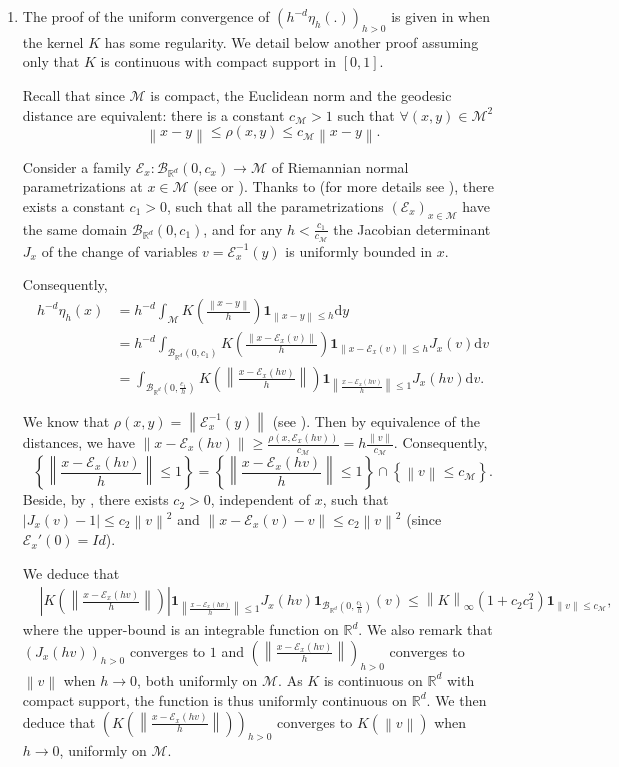 \documentclass[10pt,a4paper]{article}
\newcommand{\R}{{\mathbb R}}
\newcommand{\ind}{{\mathbf 1}}
\newcommand{\B}{\mathcal{B}} %
\newcommand\cB{\mathcal{B}}
\newcommand\cE{\mathcal{E}}
\newcommand\cM{\mathcal{M}}
\newcommand\dR{\mathbb{R}}
\newcommand\dd{\mathrm{d}}
\newcommand{\ABS}[1]{{{\left| #1 \right|}}} %
\newcommand{\BRA}[1]{{{\left\{#1\right\}}}} %
\newcommand{\NRM}[1]{{{\left\| #1\right\|}}} %
\newcommand{\PAR}[1]{{{\left(#1\right)}}} %
\begin{document}
\begin{enumerate}[label=(\roman*)]
\item 
The proof of the uniform convergence of $(h^{-d}\eta_h(.))_{h>0}$ is given in \cite[Lemma 10]{Divol2022} when the kernel $K$ has some regularity. 
We detail below another proof assuming only that $K$ is continuous with compact support in $[0,1]$.



Recall that since $\cM$ is compact, the Euclidean norm and the geodesic distance are equivalent: there is a constant $c_\cM>1$ such that $\forall (x,y)\in\cM^2$
\[
\NRM{x-y}\le \rho(x,y)\le c_\cM\NRM{x-y}.
\]


Consider a family $\cE_x: \B_{\R^d}(0,c_x) \rightarrow \cM$ of Riemannian normal parametrizations at $x\in\cM$ (see \cite[Section 3.1]{guerinnguyentran} or \cite[Proposition 5.24]{Lee2018}). 
Thanks to  \cite[Theorem 3.4]{guerinnguyentran} (for more details see \cite[Proposition 10.37]{Lee2018}),  there exists a constant $c_1>0$, such that all the parametrizations $(\cE_x)_{x\in\cM}$ have the same domain $\cB_{\dR^d}(0,c_1)$, and for any $h<\frac{c_1}{c_\cM}$ the Jacobian determinant $J_x$ of the change of variables $v=\cE_x^{-1}(y)$  is uniformly bounded in $x$. 


Consequently,
\begin{align*}
h^{-d}\eta_h(x)&=h^{-d}\int_\cM K\PAR{\frac{\NRM{x-y}}{h}}\ind_{\NRM{x-y}\le h}\dd y\\
&=h^{-d}\int_{\cB_{\dR^d}(0,c_1)} K\PAR{\frac{\NRM{x - \cE_x(v)}}{h}}\ind_{\NRM{x - \cE_x(v)}\le h}J_x(v)\dd v\\
&=\int_{\cB_{\dR^d}\PAR{0,\frac{c_1}{h}}} K\PAR{\NRM{\frac{x - \cE_x(hv)}{h}}}\ind_{\NRM{\frac{x - \cE_x(hv)}{h}}\le 1}J_x(hv)\dd v.
\end{align*}

We know that $\rho(x,y)=\NRM{\cE^{-1}_x(y)}$ (see \cite[Theorem 3.2]{guerinnguyentran}). Then by equivalence of the distances, we have $\NRM{x-\cE_x(hv)}\ge \frac{\rho(x,\cE_x(hv))}{c_\cM}= h\frac{\NRM{v}}{c_\cM}$. Consequently,
\[
\BRA{\NRM{\frac{x - \cE_x(hv)}{h}}\le 1}= \BRA{\NRM{\frac{x - \cE_x(hv)}{h}}\le 1}\cap \BRA{\NRM{v}\le c_\cM }.
\]
Beside, by \cite[Theorem 3.4]{guerinnguyentran}, there exists $c_2>0$, independent of $x$, such that $\ABS{J_x(v)-1}\le c_2 \NRM{v}^2$  and $\NRM{x - \cE_x(v)-v}\le c_2\NRM{v}^2$ (since $\cE_x'(0)=Id$). 

We deduce that
 \begin{align*}
 &\ABS{K\PAR{\NRM{\frac{x - \cE_x(hv)}{h}}}}\ind_{\NRM{\frac{x - \cE_x(hv)}{h}}\le 1}J_x(hv)\ind_{\cB_{\dR^d}\PAR{0,\frac{c_1}{h}}}(v)\le \NRM{K}_\infty (1+c_2c_1^2)\ind_{\NRM{v}\le c_\cM},
 \end{align*}
where the upper-bound is an integrable function on $\dR^d$. 
We also remark that $(J_x(hv))_{h>0}$ converges to $1$ and $\PAR{\NRM{\frac{x - \cE_x(hv)}{h}}}_{h>0}$ converges to $\NRM{v}$ when $h\to 0$, both uniformly on $\cM$.
As $K$ is continuous on $\dR^d$ with compact support, the function is thus uniformly continuous on $\dR^d$. We then deduce that $\PAR{K\PAR{\NRM{\frac{x - \cE_x(hv)}{h}}}}_{h>0}$ converges to $K(\NRM{v})$ when $h\to 0$,  uniformly on $\cM$. 


\end{enumerate}
\end{document}
